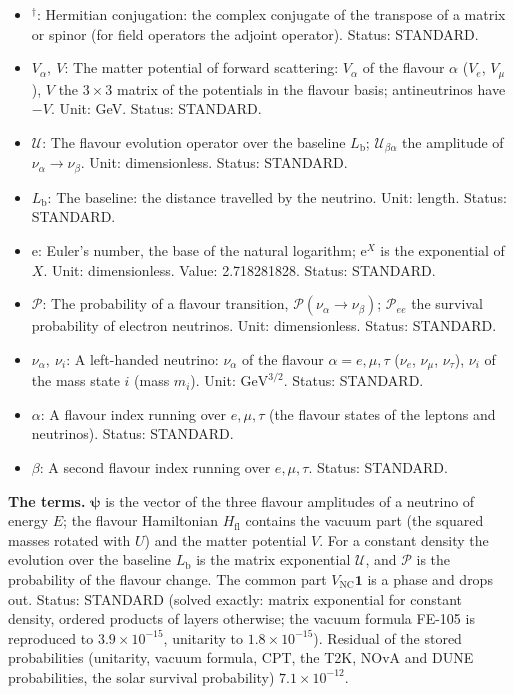 \documentclass[
  10pt,
]{article}
\begin{document}
\begin{itemize}
  \(\nu_2\), \(\nu_3\) (normal ordering). Unit: GeV (quoted in meV).
  Value: 1.000, 8.712, 50.140 meV (\(m_1\) ASSUMED). Status: DERIVED.
\item
  \({}^\dagger\): Hermitian conjugation: the complex conjugate of the
  transpose of a matrix or spinor (for field operators the adjoint
  operator). Status: STANDARD.
\item
  \(V_\alpha,\ V\): The matter potential of forward scattering:
  \(V_\alpha\) of the flavour \(\alpha\) (\(V_e\), \(V_\mu\)), \(V\) the
  \(3 \times 3\) matrix of the potentials in the flavour basis;
  antineutrinos have \(-V\). Unit: GeV. Status: STANDARD.
\item
  \(\mathcal{U}\): The flavour evolution operator over the baseline
  \(L_{\mathrm{b}}\); \(\mathcal{U}_{\beta\alpha}\) the amplitude of
  \(\nu_\alpha \to \nu_\beta\). Unit: dimensionless. Status: STANDARD.
\item
  \(L_{\mathrm{b}}\): The baseline: the distance travelled by the
  neutrino. Unit: length. Status: STANDARD.
\item
  \(\mathrm{e}\): Euler's number, the base of the natural logarithm;
  \(\mathrm{e}^{X}\) is the exponential of \(X\). Unit: dimensionless.
  Value: 2.718281828. Status: STANDARD.
\item
  \(\mathcal{P}\): The probability of a flavour transition,
  \(\mathcal{P}(\nu_\alpha \to \nu_\beta)\); \(\mathcal{P}_{ee}\) the
  survival probability of electron neutrinos. Unit: dimensionless.
  Status: STANDARD.
\item
  \(\nu_\alpha,\ \nu_i\): A left-handed neutrino: \(\nu_\alpha\) of the
  flavour \(\alpha = e, \mu, \tau\) (\(\nu_e\), \(\nu_\mu\),
  \(\nu_\tau\)), \(\nu_i\) of the mass state \(i\) (mass \(m_i\)). Unit:
  \(\mathrm{GeV}^{3/2}\). Status: STANDARD.
\item
  \(\alpha\): A flavour index running over \(e, \mu, \tau\) (the flavour
  states of the leptons and neutrinos). Status: STANDARD.
\item
  \(\beta\): A second flavour index running over \(e, \mu, \tau\).
  Status: STANDARD.
\end{itemize}

\textbf{The terms.} \(\boldsymbol{\psi}\) is the vector of the three
flavour amplitudes of a neutrino of energy \(E\); the flavour
Hamiltonian \(H_{\mathrm{fl}}\) contains the vacuum part (the squared
masses rotated with \(U\)) and the matter potential \(V\). For a
constant density the evolution over the baseline \(L_{\mathrm{b}}\) is
the matrix exponential \(\mathcal{U}\), and \(\mathcal{P}\) is the
probability of the flavour change. The common part
\(V_{\mathrm{NC}}\mathbf{1}\) is a phase and drops out. Status: STANDARD
(solved exactly: matrix exponential for constant density, ordered
products of layers otherwise; the vacuum formula FE-105 is reproduced to
\(3.9\times10^{-15}\), unitarity to \(1.8\times10^{-15}\)). Residual of
the stored probabilities (unitarity, vacuum formula, CPT, the T2K, NOvA
and DUNE probabilities, the solar survival probability)
\(7.1\times10^{-12}\).
\end{document}
